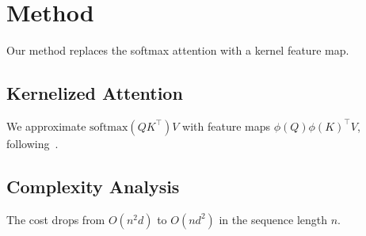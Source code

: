\section{Method}\label{sec:method}
Our method replaces the softmax attention with a kernel feature map.

\subsection{Kernelized Attention}\label{sec:kernel}
We approximate $\mathrm{softmax}(QK^\top)V$ with feature maps $\phi(Q)\phi(K)^\top V$,
following~\cite{katharopoulos2020linear}.

\subsection{Complexity Analysis}\label{sec:complexity}
The cost drops from $O(n^2 d)$ to $O(n d^2)$ in the sequence length $n$.
